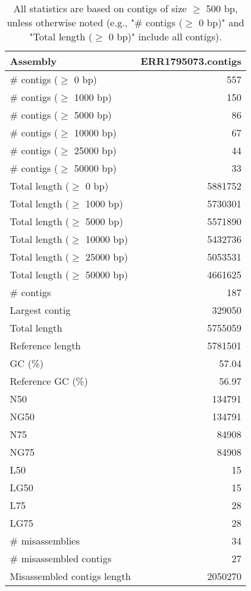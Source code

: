 \documentclass[12pt,a4paper]{article}
\begin{document}
\begin{table}[ht]
\begin{center}
\caption{All statistics are based on contigs of size $\geq$ 500 bp, unless otherwise noted (e.g., "\# contigs ($\geq$ 0 bp)" and "Total length ($\geq$ 0 bp)" include all contigs).}
\begin{tabular}{|l*{1}{|r}|}
\hline
Assembly & ERR1795073.contigs \\ \hline
\# contigs ($\geq$ 0 bp) & 557 \\ \hline
\# contigs ($\geq$ 1000 bp) & 150 \\ \hline
\# contigs ($\geq$ 5000 bp) & 86 \\ \hline
\# contigs ($\geq$ 10000 bp) & 67 \\ \hline
\# contigs ($\geq$ 25000 bp) & 44 \\ \hline
\# contigs ($\geq$ 50000 bp) & 33 \\ \hline
Total length ($\geq$ 0 bp) & 5881752 \\ \hline
Total length ($\geq$ 1000 bp) & 5730301 \\ \hline
Total length ($\geq$ 5000 bp) & 5571890 \\ \hline
Total length ($\geq$ 10000 bp) & 5432736 \\ \hline
Total length ($\geq$ 25000 bp) & 5053531 \\ \hline
Total length ($\geq$ 50000 bp) & 4661625 \\ \hline
\# contigs & 187 \\ \hline
Largest contig & 329050 \\ \hline
Total length & 5755059 \\ \hline
Reference length & 5781501 \\ \hline
GC (\%) & 57.04 \\ \hline
Reference GC (\%) & 56.97 \\ \hline
N50 & 134791 \\ \hline
NG50 & 134791 \\ \hline
N75 & 84908 \\ \hline
NG75 & 84908 \\ \hline
L50 & 15 \\ \hline
LG50 & 15 \\ \hline
L75 & 28 \\ \hline
LG75 & 28 \\ \hline
\# misassemblies & 34 \\ \hline
\# misassembled contigs & 27 \\ \hline
Misassembled contigs length & 2050270 \\ \hline

\end{tabular}
\end{center}
\end{table}
\end{document}
